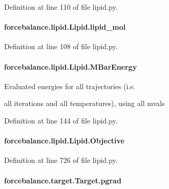 Definition at line 110 of file lipid.\-py.

\hypertarget{classforcebalance_1_1lipid_1_1Lipid_a1e5ac68a7b79b3481acb17ed86db8aa1}{
\paragraph[{lipid\-\_\-mol}]{\setlength{\rightskip}{0pt plus 5cm}forcebalance.\-lipid.\-Lipid.\-lipid\-\_\-mol}}\label{classforcebalance_1_1lipid_1_1Lipid_a1e5ac68a7b79b3481acb17ed86db8aa1}


Definition at line 108 of file lipid.\-py.

\hypertarget{classforcebalance_1_1lipid_1_1Lipid_aa41ccbc13f7ca3f0700b825a9e51a24a}{
\paragraph[{M\-Bar\-Energy}]{\setlength{\rightskip}{0pt plus 5cm}forcebalance.\-lipid.\-Lipid.\-M\-Bar\-Energy}}\label{classforcebalance_1_1lipid_1_1Lipid_aa41ccbc13f7ca3f0700b825a9e51a24a}


Evaluated energies for all trajectories (i.\-e. 

all iterations and all temperatures), using all mvals 

Definition at line 144 of file lipid.\-py.

\hypertarget{classforcebalance_1_1lipid_1_1Lipid_a0ffb4377a0cfdf7572166bb6e8d5b130}{
\paragraph[{Objective}]{\setlength{\rightskip}{0pt plus 5cm}forcebalance.\-lipid.\-Lipid.\-Objective}}\label{classforcebalance_1_1lipid_1_1Lipid_a0ffb4377a0cfdf7572166bb6e8d5b130}


Definition at line 726 of file lipid.\-py.

\hypertarget{classforcebalance_1_1target_1_1Target_a684235b4332b608c4e2da22982c2fdfa}{
\paragraph[{pgrad}]{\setlength{\rightskip}{0pt plus 5cm}forcebalance.\-target.\-Target.\-pgrad\hspace{0.3cm}{\ttfamily [inherited]}}}\label{classforcebalance_1_1target_1_1Target_a684235b4332b608c4e2da22982c2fdfa}


